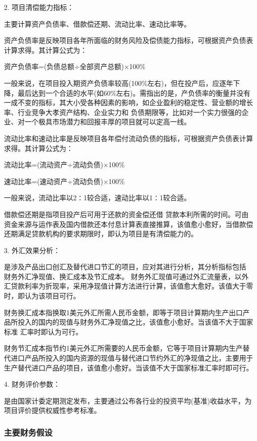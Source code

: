 \documentclass[10pt,letterpaper]{article}
\begin{document}
2.	项目清偿能力指标：

主要计算资产负债率、借款偿还期、流动比率、速动比率等。

资产负债率是反映项目各年所面临的财务风险及偿债能力指标，可根据资产负债表计算求得。其计算公式为：

资产负债率=(负债总额÷全部资产总额)×100\%

一般来说，在项目投入期资产负债率较高(100\%左右)，但在投产后，应逐年下降，最后达到一个合适的水平(如60\%左右)。需指出的是，产负债率的衡量并没有一成不变的指标，其大小受各种因素的影响，如企业盈利的稳定性、营业额的增长率、行业竞争大孝资产结构、企业实力和 负债期限等，比如对一个实力很强的企业、对一个极具市场潜力和回报丰厚的项目就可以定高一线。

流动比率和速动比率是反映项目各年偿付流动负债的指标，可根据资产负债表计算求得。其计算公式为：

流动比率=(流动资产÷流动负债)×100\%

速动比率=(速动资产÷流动负债)×100\%

一般来说，流动比率以2∶1较合适，速动比率以1∶1较合适。

借款偿还期是指项目投产后可用于还款的资金偿还借 贷款本利所需的时间。可由资金来源与运作表及国内借款还本付息计算表直接推算，该值愈小愈好，当借款偿还期满足贷款机构的要求期限时，即认为项目是有清偿能力的。

3.	外汇效果分析：

是涉及产品出口创汇及替代进口节汇的项目，应对其进行分析，其分析指标包括 财务外汇净现值、换汇成本及节汇成本。 财务外汇现值可通过外汇流量表，以外汇贷款利率为折现率，采用净现值计算方法进行计算，该值愈大愈好。该值大于零时，即认为该项目可行。

财务换汇成本指换取1美元外汇所需人民币金额，即等于项目计算期内生产出口产品所投入的国内的现值与财务外汇净现值之比，该值愈小愈好。当该值不大于国家标准 汇率时即认为可行。

财务节汇成本指节约1美元外汇所需要的人民币金额，它等于项目计算期内生产替代进口产品所投入的国内资源的现值与替代进口节约外汇的净现值之比，主要用于生产替代进口产品的项目，该值愈小愈好。当该值不大于国家标准汇率时即可行。

4.	财务评价参数：

是由国家计委定期测定发布，主要通过公布各行业的投资平均(基准)收益水平，为项目评价提供权威性参考标准。

\subsubsection{主要财务假设}
\end{document}
